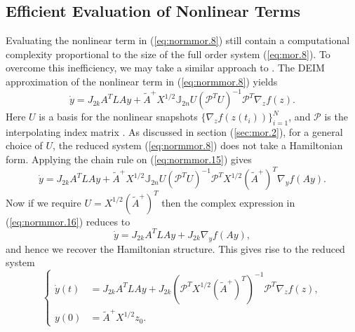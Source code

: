 \subsection{Efficient Evaluation of Nonlinear Terms} \label{sec:normmor.3}
Evaluating the nonlinear term in (\ref{eq:normmor.8}) still contain a computational complexity proportional to the size of the full order system (\ref{eq:mor.8}). To overcome this inefficiency, we may take a similar approach to . The DEIM approximation of the nonlinear term in (\ref{eq:normmor.8}) yields
\begin{equation} \label{eq:normmor.15}
	\dot y = J_{2k} A^TLAy + \tilde A ^+ X^{1/2} \mathbb J_{2n} U (\mathcal P^TU)^{-1}\mathcal  P^T \nabla_z f(z).
\end{equation}
Here $U$ is a basis for the nonlinear snapshots $\{\nabla_z f(z(t_i))\}_{i=1}^N$, and $\mathcal P$ is the interpolating index matrix \cite{Chaturantabut:2010cz}. As discussed in section (\ref{sec:mor.2}), for a general choice of $U$, the reduced system (\ref{eq:normmor.8}) does not take a Hamiltonian form. Applying the chain rule on (\ref{eq:normmor.15}) gives
\begin{equation} \label{eq:normmor.16}
	\dot y = J_{2k} A^TLAy + \tilde A ^+ X^{1/2} \mathbb J_{2n} U (\mathcal P^TU)^{-1} \mathcal P^T X^{1/2} (\tilde A^+)^T \nabla_y f(Ay).
\end{equation}
Now if we require $U = X^{1/2} (\tilde A^+)^T$ then the complex expression in (\ref{eq:normmor.16}) reduces to
\begin{equation} \label{eq:normmor.17}
	\dot y = J_{2k} A^TLAy + J_{2k} \nabla_y f(Ay),
\end{equation}
and hence we recover the Hamiltonian structure. This gives rise to the reduced system
\begin{equation} \label{eq:normmor.18}
\left\{
\begin{aligned}
	\dot y(t) &= J_{2k} A^TLAy + J_{2k} (\mathcal P^TX^{1/2} (\tilde A^+)^T)^{-1} \mathcal P^T \nabla_z f(z), \\
	y(0) &= \tilde A^+ X^{1/2} z_0.
\end{aligned}
\right.
\end{equation}

